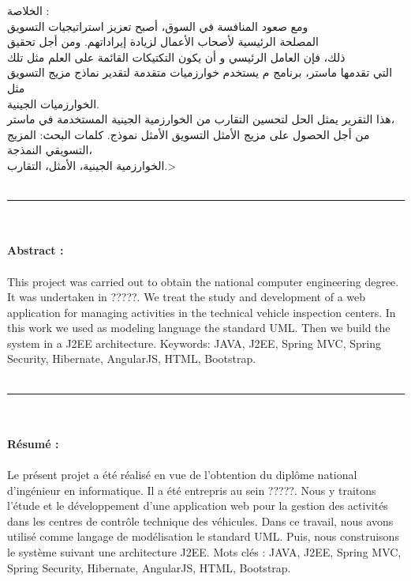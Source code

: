 \<الخلاصة :\\ ومع صعود المنافسة في السوق، أصبح تعزيز استراتيجيات التسويق \\المصلحة الرئيسية لأصحاب الأعمال لزيادة إيراداتهم. ومن أجل تحقيق  \\ذلك، فإن العامل الرئيسي و أن يكون التكتيكات القائمة على العلم مثل تلك \\التي تقدمها ماستر، برنامج م يستخدم خوارزميات متقدمة لتقدير نماذج مزيج التسويق مثل  \\الخوارزميات الجينية. \\هذا التقرير يمثل الحل لتحسين التقارب من الخوارزمية الجينية المستخدمة في ماستر، \\من أجل الحصول على مزيج الأمثل التسويق الأمثل نموذج. كلمات البحث: المزيج التسويقي النمذجة، \\الخوارزمية الجينية، الأمثل، التقارب.>
\\
\\
\noindent\rule{16cm}{0.4pt}
\\
\\
\textbf{Abstract :}
\\
\\
This project was carried out to obtain the national computer engineering degree. It was
undertaken in ?????. We treat the study and development of a web application for managing
activities in the technical vehicle inspection centers.
In this work we used as modeling language the standard UML. Then we build the system in
a J2EE architecture.
Keywords: JAVA, J2EE, Spring MVC, Spring Security, Hibernate, AngularJS, HTML,
Bootstrap.
\\
\\
\noindent\rule{16cm}{0.4pt}
\\
\\
\textbf{Résumé :}
\\
\\
Le présent projet a été réalisé en vue de l’obtention du diplôme national d’ingénieur en
informatique. Il a été entrepris au sein ?????. Nous y traitons l’étude et le développement
d’une application web pour la gestion des activités dans les centres de contrôle technique des
véhicules.
Dans ce travail, nous avons utilisé comme langage de modélisation le standard UML. Puis,
nous construisons le système suivant une architecture J2EE.
Mots clés : JAVA, J2EE, Spring MVC, Spring Security, Hibernate, AngularJS, HTML,
Bootstrap.